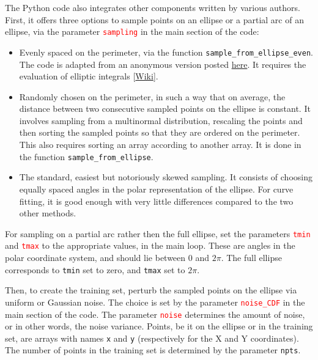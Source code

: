 \documentclass[oneside,10pt]{book}
\begin{document}
\noindent The Python code also integrates other components written by various authors. First, it offers three options to sample points on an ellipse or a partial arc of an ellipse, via the parameter \textcolor{red}{\texttt{sampling}} in the main section of the code: 
\begin{itemize}
\item Evenly spaced on the perimeter, via the function \texttt{sample\_from\_ellipse\_even}. The code is adapted from an anonymous version posted 
\href{https://math.stackexchange.com/questions/3710402/generate-random-points-on-perimeter-of-ellipse}{here}. It requires the evaluation of
 \textcolor{index}{elliptic integrals} [\href{https://en.wikipedia.org/wiki/Elliptic_integral}{Wiki}]. 
\item Randomly chosen on the perimeter, in such a way that on average, the distance between two consecutive sampled points on the ellipse is constant. 
 It involves sampling from a multinormal distribution, rescaling the points and then sorting the sampled points so that they are ordered on the perimeter. This 
 also requires sorting an array according to another array.  It is done in the function
 \texttt{sample\_from\_ellipse}.
\item The standard, easiest but notoriously skewed sampling. It consists of choosing equally spaced angles in the polar representation of the ellipse. For curve fitting, it is good enough with very little differences compared to the two other methods.
\end{itemize}

\noindent For sampling on a partial arc rather then the full ellipse, set the parameters 
\textcolor{red}{\texttt{tmin}} and \textcolor{red}{\texttt{tmax}} to the appropriate values, in the main loop.
These are angles in the polar coordinate system, and should lie between $0$ and $2\pi$. The full ellipse corresponds to
 \texttt{tmin} set to zero, and \texttt{tmax} set to $2\pi$. \vspace{1ex}

\vspace{1ex}

\noindent Then, to create the training set, perturb the sampled points on the ellipse via uniform or Gaussian noise. 
 The choice is set by the parameter \textcolor{red}{\texttt{noise\_CDF}} in the main section of the code. The parameter 
\textcolor{red}{\texttt{noise}} determines the amount of noise, or in other words, the noise variance. Points, be it on the ellipse or in the training set,
 are arrays with names \texttt{x} and \texttt{y} (respectively for the X and Y coordinates). The number of points in the  training set is determined
 by the parameter \textcolor{index}{\texttt{npts}}.
\end{document}
